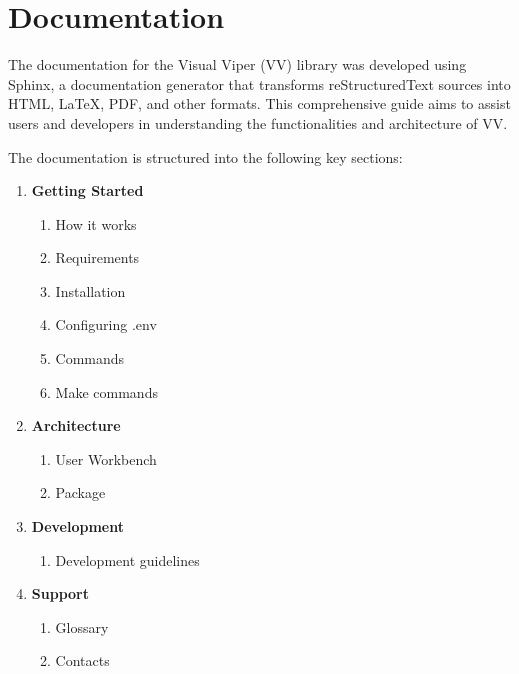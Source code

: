 \section{Documentation}\label{documentation}

The documentation for the Visual Viper (VV) library was developed using
Sphinx, a documentation generator that transforms reStructuredText
sources into HTML, LaTeX, PDF, and other formats. This comprehensive
guide aims to assist users and developers in understanding the
functionalities and architecture of VV.

The documentation is structured into the following key sections:

\begin{enumerate}
\def\labelenumi{\arabic{enumi}.}
\item
  \textbf{Getting Started}

  \begin{enumerate}
  \def\labelenumii{\alph{enumii}.}
  \item
    How it works
  \item
    Requirements
  \item
    Installation
  \item
    Configuring .env
  \item
    Commands
  \item
    Make commands
  \end{enumerate}
\item
  \textbf{Architecture}

  \begin{enumerate}
  \def\labelenumii{\alph{enumii}.}
  \item
    User Workbench
  \item
    Package
  \end{enumerate}
\item
  \textbf{Development}

  \begin{enumerate}
  \def\labelenumii{\alph{enumii}.}
  \item
    Development guidelines
  \end{enumerate}
\item
  \textbf{Support}

  \begin{enumerate}
  \def\labelenumii{\alph{enumii}.}
  \item
    Glossary
  \item
    Contacts
  \end{enumerate}
\end{enumerate}

